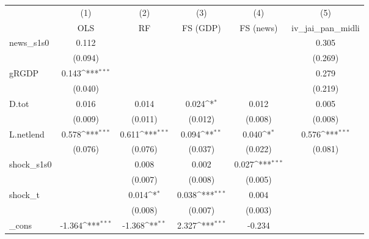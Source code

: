 {
\def\sym#1{\ifmmode^{#1}\else\(^{#1}\)\fi}
\begin{tabular}{l*{5}{c}}
\toprule
            &\multicolumn{1}{c}{(1)}&\multicolumn{1}{c}{(2)}&\multicolumn{1}{c}{(3)}&\multicolumn{1}{c}{(4)}&\multicolumn{1}{c}{(5)}\\
            &\multicolumn{1}{c}{OLS}&\multicolumn{1}{c}{RF}&\multicolumn{1}{c}{FS (GDP)}&\multicolumn{1}{c}{FS (news)}&\multicolumn{1}{c}{iv\_jai\_pan\_midli}\\
\midrule
news\_s1s0   &       0.112         &                     &                     &                     &       0.305         \\
            &     (0.094)         &                     &                     &                     &     (0.269)         \\
\addlinespace
gRGDP       &       0.143\sym{***}&                     &                     &                     &       0.279         \\
            &     (0.040)         &                     &                     &                     &     (0.219)         \\
\addlinespace
D.tot       &       0.016         &       0.014         &       0.024\sym{*}  &       0.012         &       0.005         \\
            &     (0.009)         &     (0.011)         &     (0.012)         &     (0.008)         &     (0.008)         \\
\addlinespace
L.netlend   &       0.578\sym{***}&       0.611\sym{***}&       0.094\sym{**} &       0.040\sym{*}  &       0.576\sym{***}\\
            &     (0.076)         &     (0.076)         &     (0.037)         &     (0.022)         &     (0.081)         \\
\addlinespace
shock\_s1s0  &                     &       0.008         &       0.002         &       0.027\sym{***}&                     \\
            &                     &     (0.007)         &     (0.008)         &     (0.005)         &                     \\
\addlinespace
shock\_t     &                     &       0.014\sym{*}  &       0.038\sym{***}&       0.004         &                     \\
            &                     &     (0.008)         &     (0.007)         &     (0.003)         &                     \\
\addlinespace
\_cons      &      -1.364\sym{***}&      -1.368\sym{**} &       2.327\sym{***}&      -0.234         &                     \\

\end{tabular}}
